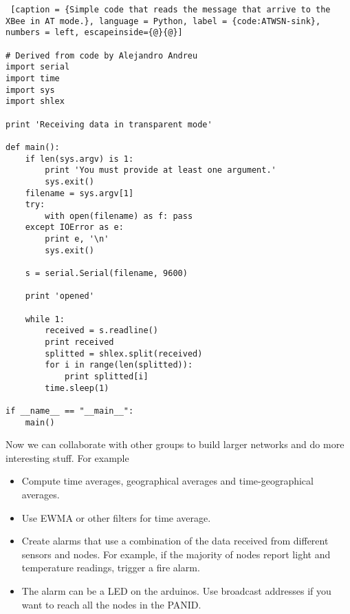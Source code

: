 \begin{lstlisting} [caption = {Simple code that reads the message that arrive to the XBee in AT mode.}, language = Python, label = {code:ATWSN-sink}, numbers = left, escapeinside={@}{@}]

# Derived from code by Alejandro Andreu
import serial
import time
import sys
import shlex

print 'Receiving data in transparent mode'

def main():
    if len(sys.argv) is 1:
        print 'You must provide at least one argument.'
        sys.exit()
    filename = sys.argv[1]
    try:
        with open(filename) as f: pass
    except IOError as e:
        print e, '\n'
        sys.exit()

    s = serial.Serial(filename, 9600)

    print 'opened'

    while 1:
        received = s.readline()
        print received
        splitted = shlex.split(received)
        for i in range(len(splitted)):
            print splitted[i]
        time.sleep(1)

if __name__ == "__main__":
    main()
\end{lstlisting}

Now we can collaborate with other groups to build larger networks and do more interesting stuff.
For example
\begin{itemize}
\item Compute time averages, geographical averages and time-geographical averages.
\item Use EWMA or other filters for time average.
\item Create alarms that use a combination of the data received from different sensors and nodes. 
For example, if the majority of nodes report light and temperature readings, trigger a fire alarm.
\item The alarm can be a LED on the arduinos.
Use broadcast addresses if you want to reach all the nodes in the PANID.
\end{itemize}
